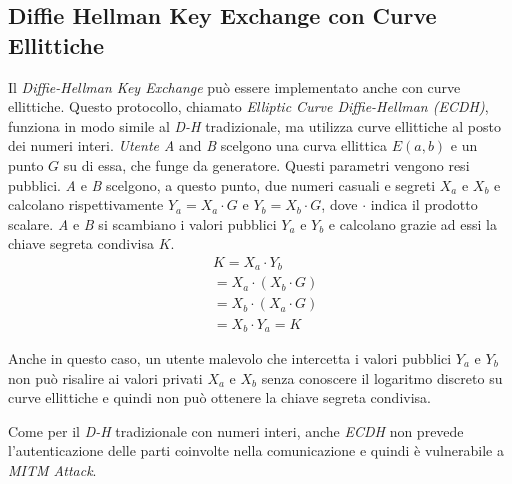 \subsection{Diffie Hellman Key Exchange con Curve Ellittiche}
\label{sec:ecdh}

Il \emph{Diffie-Hellman Key Exchange} può essere implementato anche con curve ellittiche. Questo protocollo, chiamato \emph{Elliptic Curve Diffie-Hellman (ECDH)}, funziona in modo simile al \emph{D-H} tradizionale, ma utilizza curve ellittiche al posto dei numeri interi.
\emph{Utente A} and \emph{B} scelgono una curva ellittica $E(a,b)$ e un punto $G$ su di essa, che funge da generatore. Questi parametri vengono resi pubblici.
\emph{A} e \emph{B} scelgono, a questo punto, due numeri casuali e segreti $X_a$ e $X_b$ e calcolano rispettivamente $Y_a = X_a \cdot G$ e $Y_b = X_b \cdot G$, dove $\cdot$ indica il prodotto scalare.
\emph{A} e \emph{B} si scambiano i valori pubblici $Y_a$ e $Y_b$ e calcolano grazie ad essi la chiave segreta condivisa $K$.
\begin{equation}
	\begin{aligned}
		&K = X_a \cdot Y_b\\
		&= X_a \cdot (X_b \cdot G)\\
		&= X_b \cdot (X_a \cdot G)\\
		&= X_b \cdot Y_a = K
	\end{aligned}
\end{equation}

Anche in questo caso, un utente malevolo che intercetta i valori pubblici $Y_a$ e $Y_b$ non può risalire ai valori privati $X_a$ e $X_b$ senza conoscere il logaritmo discreto su curve ellittiche e quindi non può ottenere la chiave segreta condivisa.

Come per il \emph{D-H} tradizionale con numeri interi, anche \emph{ECDH} non prevede l'autenticazione delle parti coinvolte nella comunicazione e quindi è vulnerabile a \emph{MITM Attack}.
